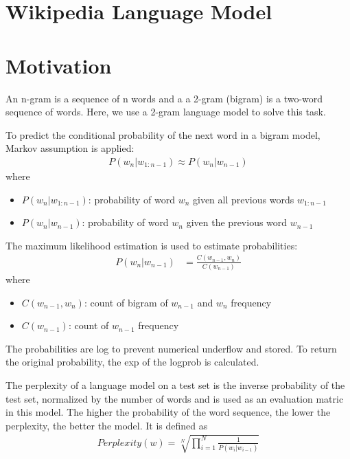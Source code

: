 \section{Wikipedia Language Model}

\section*{Motivation \cite{n-gram:ch3}}
An n-gram is a sequence of n words and a a 2-gram (bigram) is a two-word sequence of words.
Here, we use a 2-gram language model to solve this task.

To predict the conditional probability of the next word in a bigram model, Markov assumption is applied:
\begin{align}
    P(w_n | w_{1:n-1}) \approx P(w_n | w_{n-1})
\end{align}
where
\begin{itemize}
    \item $P(w_n | w_{1:n-1})$: probability of word $w_n$ given all previous words $w_{1:n-1}$
    \item $P(w_n | w_{n-1})$: probability of word $w_n$ given the previous word $w_{n-1}$
\end{itemize}

The maximum likelihood estimation is used to estimate probabilities:
\begin{align}
    P(w_n | w_{n-1}) %
    &=\frac{C(w_{n-1}, w_n)}{C(w_{n-1})}
\end{align}
where
\begin{itemize}
    \item $C(w_{n-1}, w_n)$: count of bigram of $w_{n-1}$ and $w_n$ frequency
    \item $C(w_{n-1})$: count of $w_{n-1}$ frequency
\end{itemize}

The probabilities are log to prevent numerical underflow and stored. 
To return the original probability, the exp of the logprob is calculated.


The perplexity of a language model on a test set is the inverse probability of the test set, normalized by the number of words and is used as an evaluation matric in this model.
The higher the probability of the word sequence, the lower the perplexity, the better the model.
It is defined as 
\begin{align}
    Perplexity(w) = \sqrt[N]{\prod_{i=1}^{N} \frac{1}{P(w_i | w_{i-1})}}
    \label{eq:perplexity}
\end{align}


